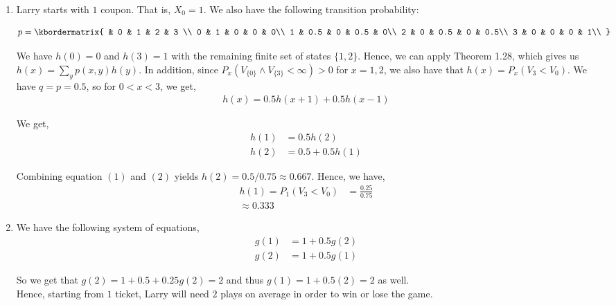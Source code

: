 \documentclass[12pt]{article}
\begin{document}
\begin{enumerate}[label=(\alph*)]

\item Larry starts with $1$ coupon. That is, $X_0 = 1$. We also have the following transition probability:

\begin{align*}
p = \kbordermatrix{
    & 0 & 1 & 2 & 3 \\
    0 & 1 & 0 & 0 & 0\\
    1 & 0.5 & 0 & 0.5 & 0\\
    2 & 0 & 0.5 & 0 & 0.5\\
    3 & 0 & 0 & 0 & 1\\
  }
\end{align*}

We have $h(0) = 0$ and $h(3) = 1$ with the remaining finite set of states $\{1, 2\}$. Hence, we can apply Theorem 1.28, which gives us $h(x) = \sum_y p(x, y) h(y)$. In addition, since $P_x(V_{\{0\}} \wedge V_{\{3\}} < \infty) > 0$ for $x = 1, 2$, we also have that $h(x) = P_x(V_3 < V_0)$. We have $q = p = 0.5$, so for $0 < x < 3$, we get,
\begin{align*}
h(x) = 0.5h(x+1) + 0.5h(x-1)
\end{align*}

We get,
\begin{align*}
h(1) &= 0.5h(2)\\
h(2) &= 0.5 + 0.5h(1)
\end{align*}

Combining equation $(1)$ and $(2)$ yields $h(2) = 0.5/0.75 \approx 0.667$. Hence, we have,
\begin{align*}
h(1) = P_1(V_3 < V_0) &= \frac{0.25}{0.75}\\
\approx 0.333
\end{align*}

\item We have the following system of equations,
\begin{align*}
g(1) &= 1 + 0.5g(2)\\
g(2) &= 1 + 0.5g(1)
\end{align*}

So we get that $g(2) = 1 + 0.5 + 0.25g(2) = 2$ and thus $g(1) = 1 + 0.5(2) = 2$ as well.\\

Hence, starting from $1$ ticket, Larry will need $2$ plays on average in order to win or lose the game.

\end{enumerate}
\end{document}
